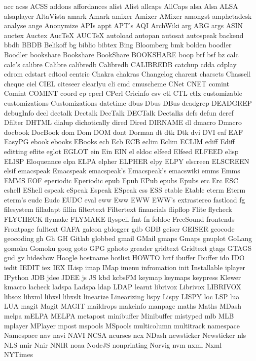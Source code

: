 acc
acss
ACSS
addons
affordances
alist
Alist
allcaps
AllCaps
alsa
Alsa
ALSA
alsaplayer
AltaVista
amark
Amark
amixer
Amixer
AMixer
amongst
amphetadesk
analyse
ange
Anonymize
APIs
appt
APT's
AQI
ArchWiki
arg
ARG
args
ASIN
auctex
Auctex
AucTeX
AUCTeX
autoload
autopan
autosat
autospeak
backend
bbdb
BBDB
Belikoff
bg
biblio
bibtex
Bing
Bloomberg
bmk
bolden
boodler
Boodler
bookshare
Bookshare
BookShare
BOOKSHARE
boop
brf
bsf
bz
calc
calc's
calibre
Calibre
calibredb
Calibredb
CALIBREDB
catchup
cdda
cdplay
cdrom
cdstart
cdtool
centric
Chakra
chakras
Changelog
charent
charsets
Chassell
cheque
ciel
CIEL
citeseer
clearlyu
cli
cmd
cmuscheme
CNet
CNET
comint
Comint
COMINT
coord
cp
cperl
CPerl
Cricinfo
csv
ctl
CTL
ctlx
customizable
customizations
Customizations
datetime
dbus
Dbus
DBus
deadgrep
DEADGREP
debugInfo
decl
dectalk
Dectalk
DecTalk
DECTalk
Dectalks
defs
defun
deref
Dfilter
DHTML
dialup
dichotically
dired
Dired
DIRNAME
dl
dmacro
Dmacro
docbook
DocBook
dom
Dom
DOM
dont
Dorman
dt
dtk
Dtk
dvi
DVI
eaf
EAF
EasyPG
ebook
ebooks
EBooks
ecb
Ecb
ECB
eclim
Eclim
ECLIM
ediff
Ediff
editting
eflite
eglot
EGLOT
ein
Ein
EIN
el
eldoc
elfeed
Elfeed
ELFEED
elisp
ELISP
Eloquennce
elpa
ELPA
elpher
ELPHER
elpy
ELPY
elscreen
ELSCREEN
elsif
emacspeak
Emacspeak
emacspeak's
Emacspeak's
emacswiki
emms
Emms
EMMS
EOF
eperiodic
Eperiodic
epub
Epub
EPub
epubs
Epubs
erc
Erc
ESC
eshell
EShell
espeak
eSpeak
Espeak
ESpeak
ess
ESS
etable
Etable
eterm
Eterm
eterm's
eudc
Eudc
EUDC
eval
eww
Eww
EWW
EWW's
extrastereo
fastload
fg
filesystem
filladapt
fillin
filtertext
Filtertext
financials
flipflop
Flite
flycheck
FLYCHECK
flymake
FLYMAKE
flyspell
fmt
fn
foldoc
FreeSound
frontends
Frontpage
fulltext
GAFA
galeon
gblogger
gdb
GDB
geiser
GEISER
geocode
geocoding
gh
Gh
GH
Gitlab
globbed
gmail
GMail
gmaps
Gmaps
gnuplot
GoLang
gomoku
Gomoku
goog
goto
GPG
gphoto
greader
gridtext
Gridtext
gtags
GTAGS
gud
gv
hideshow
Hoogle
hostname
hotlist
HOWTO
hrtf
ibuffer
Ibuffer
ido
IDO
iedit
IEDIT
iex
IEX
ILisp
imap
IMap
imenu
infromation
init
Installable
iplayer
IPython
JDB
jdee
JDEE
js
JS
kbd
kcbsFM
keymap
keymaps
keypress
Klewer
kmacro
lacheck
ladspa
Ladspa
ldap
LDAP
learnt
librivox
Librivox
LIBRIVOX
libsox
libxml
libxsl
libxslt
linearize
Linearizing
lispy
Lispy
LISPY
loc
LSP
lua
LUA
magit
Magit
MAGIT
maildrops
makeinfo
manpage
maths
Maths
MDash
melpa
mELPA
MELPA
metapost
minibuffer
Minibuffer
mistyped
mlb
MLB
mplayer
MPlayer
mpost
mspools
MSpools
multicolumn
multitrack
namespace
Namespace
nav
navi
NAVI
NCSA
ncurses
ncx
NDash
newsticker
Newsticker
nls
NLS
nnir
Nnir
NNIR
noaa
NodeJS
nonprinting
Norvig
nvm
nxml
Nxml
NYTimes
